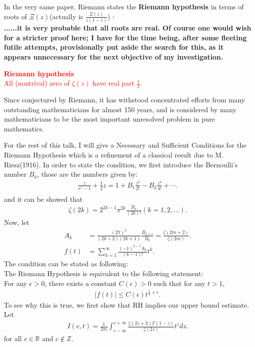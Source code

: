 \documentclass[11pt]{amsart}
\newcommand{\R}{\mathbb R}
\newcommand{\Z}{\mathbb Z}
\begin{document}
In the very same paper, Riemann states the \textbf{Riemann hypothesis} in terms
of roots of $\Xi(z)$(actually is $\frac{\Xi(z)}{z(1-z)}$) :\\
\textbf{......it is very probable that all roots are real. Of course one would wish for a stricter proof here; 
I have for the time being, after some fleeting futile attempts, provisionally put aside the search for this, 
as it appears unnecessary for the next objective of my investigation.}

\begin{center}
\textcolor{red}{ \Large \textbf{Riemann hypothesis}}\\
\textcolor{red}{\Large All (nontrival) zero of $\zeta(z)$ have real part $\frac{1}{2}$.}
\end{center}
Since conjectured by Riemann, it has withstood concentrated efforts from many outstanding mathematicians for
almost 150 years, and is considered by many mathematicians to be the most important unresolved problem in
pure mathematics.

For the rest of this talk, I will give a Necessary and Sufficient Conditions for the Riemann Hypothesis
which is a refinement of a classical result due to M. Riesz(1916). In order to state the condition, we
first introduce the Bernoulli's number $B_k$, those are the numbers given by:
\begin{align*}
\frac{z}{e^{z} -1} + \frac{1}{2}z =  1 + B_1\frac{z^{2}}{2!} - B_2 \frac{z^{4}}{4!} + \cdots. \\
\end{align*}
and it can be showed that 
\begin{align*}
\zeta(2k) = 2^{2k -1}\pi^{2k}\frac{B_k}{(2k)!}(k = 1, 2, \ldots). 
\end{align*}
Now, let 
\begin{align*}
A_k &= \frac{(2\pi)^{2}}{(2k+2)(2k+1)} \frac{B_{k+1}}{B_k} = \frac{\zeta(2m+2)}{\zeta(2m)}.\\
f(t) &= \sum^{\infty}_{k = 1} \frac{(-1)^{k-1}A_k}{(k-1)!}t^{k}.
\end{align*}
The condition can be stated as following:\\
The Riemann Hypothesis is equivalent to the following statement:\\

For any $\epsilon > 0 $, there exists a constant $C(\epsilon) > 0$ such that for any $t > 1$, 
\begin{align*}
|f(t)| \leq C(\epsilon) t^{\frac{1}{4} + \epsilon}  .
\end{align*}
To see why this is true, we first show that RH implies our upper bound estimate.\\
Let 
\begin{align*}
I(c,t) = \frac{1}{2\pi i} \int^{c + \infty}_{c -\infty} \frac{\zeta(2z +2)\Gamma(1-z)}{\zeta(2z)}t^{z} dz.
\end{align*}
for all $c \in \R$ and $c \notin \Z$.
\end{document}
